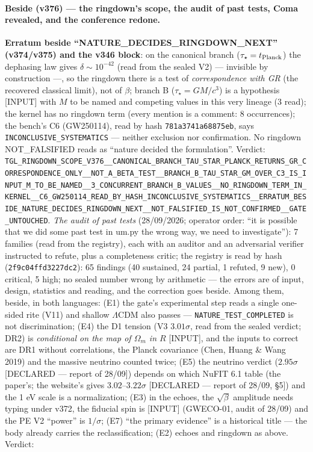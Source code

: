 \documentclass[11pt]{article}
\theoremstyle{definition}\newtheorem{deriv}{Derivation}
\begin{document}
\paragraph*{Beside (v376) --- the ringdown's scope, the audit of past tests, Coma revealed, and the conference redone.} \textbf{Erratum beside ``NATURE\_DECIDES\_RINGDOWN\_NEXT'' (v374/v375) and the v346 block}: on the canonical branch ($\tau_\star=t_{\rm Planck}$) the dephasing law gives $\delta\sim10^{-42}$ (read from the sealed V2) --- invisible by construction ---, so the ringdown there is a test of \emph{correspondence with GR} (the recovered classical limit), not of $\beta$; branch B ($\tau_\star=GM/c^3$) is a hypothesis \textsf{[INPUT]} with $M$ to be named and competing values in this very lineage (3 read); the kernel has no ringdown term (every mention is a comment: 8 occurrences); the bench's C6 (GW250114), read by hash \texttt{781a3741a68875eb}, says \texttt{INCONCLUSIVE\_SYSTEMATICS} --- neither exclusion nor confirmation. No ringdown NOT\_FALSIFIED reads as ``nature decided the formulation''. Verdict: \texttt{TGL\_RINGDOWN\_SCOPE\_V376\_\_CANONICAL\_BRANCH\_TAU\_STAR\_PLANCK\_RETURNS\_GR\_CORRESPONDENCE\_ONLY\_\_NOT\_A\_BETA\_TEST\_\_BRANCH\_B\_TAU\_STAR\_GM\_OVER\_C3\_IS\_INPUT\_M\_TO\_BE\_NAMED\_\_3\_CONCURRENT\_BRANCH\_B\_VALUES\_\_NO\_RINGDOWN\_TERM\_IN\_KERNEL\_\_C6\_GW250114\_READ\_BY\_HASH\_INCONCLUSIVE\_SYSTEMATICS\_\_ERRATUM\_BESIDE\_NATURE\_DECIDES\_RINGDOWN\_NEXT\_\_NOT\_FALSIFIED\_IS\_NOT\_CONFIRMED\_\_GATE\_UNTOUCHED}. \emph{The audit of past tests} (28/09/2026; operator order: ``it is possible that we did some past test in um.py the wrong way, we need to investigate''): 7 families (read from the registry), each with an auditor and an adversarial verifier instructed to refute, plus a completeness critic; the registry is read by hash (\texttt{2f9c04ffd3227dc2}): 65 findings (40 sustained, 24 partial, 1 refuted, 9 new), 0 critical, 5 high; no sealed number wrong by arithmetic --- the errors are of input, design, statistics and reading, and the correction goes beside. Among them, beside, in both languages: (E1) the gate's experimental step reads a single one-sided rite (V11) and shallow $\Lambda$CDM also passes --- \texttt{NATURE\_TEST\_COMPLETED} is not discrimination; (E4) the D1 tension (V3 $3.01\sigma$, read from the sealed verdict; DR2) is \emph{conditional on the map of $\Omega_m$ in $R$} \textsf{[INPUT]}, and the inputs to correct are DR1 without correlations, the Planck covariance (Chen, Huang \& Wang 2019) and the massive neutrino counted twice; (E5) the neutrino verdict ($2.95\sigma$ \textsf{[DECLARED --- report of 28/09]}) depends on which NuFIT 6.1 table (the paper's; the website's gives $3.02$--$3.22\sigma$ \textsf{[DECLARED --- report of 28/09, §5]}) and the 1 eV scale is a normalization; (E3) in the echoes, the $\sqrt\beta$ amplitude needs typing under v372, the fiducial spin is \textsf{[INPUT]} (GWECO-01, audit of 28/09) and the PE V2 ``power'' is $1/\sigma$; (E7) ``the primary evidence'' is a historical title --- the body already carries the reclassification; (E2) echoes and ringdown as above. Verdict: 
\end{document}
